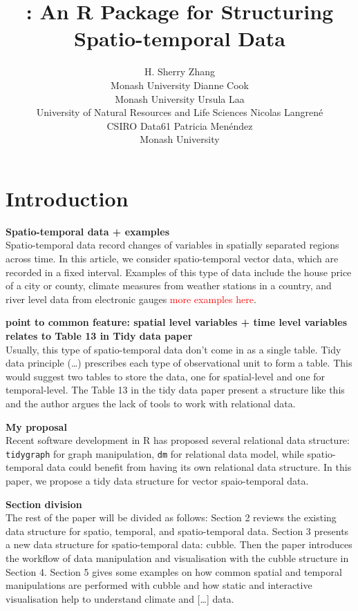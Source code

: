 \documentclass[
]{jss}
\author{
H. Sherry Zhang\\Monash University \And Dianne Cook\\Monash University
\AND Ursula Laa\\University of Natural Resources and Life Sciences
\AND Nicolas Langrené\\CSIRO Data61 \AND Patricia
Menéndez\\Monash University \AND
}
\title{\pkg{cubble}: An R Package for Structuring Spatio-temporal Data}
\begin{document}
\newpage

\hypertarget{introduction}{%
\section{Introduction}\label{introduction}}

\textbf{Spatio-temporal data + examples}\\
Spatio-temporal data record changes of variables in spatially separated
regions across time. In this article, we consider spatio-temporal vector
data, which are recorded in a fixed interval. Examples of this type of
data include the house price of a city or county, climate measures from
weather stations in a country, and river level data from electronic
gauges \textcolor{red}{more examples here}. \newline

\textbf{point to common feature: spatial level variables + time level
variables relates to Table 13 in Tidy data paper}\\
Usually, this type of spatio-temporal data don't come in as a single
table. Tidy data principle (\ldots) prescribes each type of
observational unit to form a table. This would suggest two tables to
store the data, one for spatial-level and one for temporal-level. The
Table 13 in the tidy data paper present a structure like this and the
author argues the lack of tools to work with relational data. \newline

\textbf{My proposal}\\
Recent software development in R has proposed several relational data
structure: \texttt{tidygraph}\citep{tidygraph} for graph manipulation,
\texttt{dm} \citep{dm} for relational data model, while spatio-temporal
data could benefit from having its own relational data structure. In
this paper, we propose a tidy data structure for vector spaio-temporal
data. \newline

\textbf{Section division}\\
The rest of the paper will be divided as follows: Section 2 reviews the
existing data structure for spatio, temporal, and spatio-temporal data.
Section 3 presents a new data structure for spatio-temporal data:
cubble. Then the paper introduces the workflow of data manipulation and
visualisation with the cubble structure in Section 4. Section 5 gives
some examples on how common spatial and temporal manipulations are
performed with cubble and how static and interactive visualisation help
to understand climate and {[}\ldots{]} data. \newline
\end{document}
